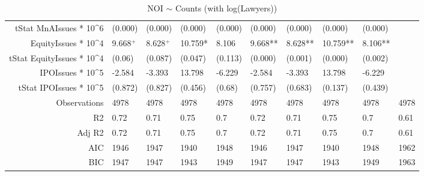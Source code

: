 \begin{table}[ht]
\begin{tabular}{rlllllllll}
  tStat MnAIssues * 10^6 & (0.000) & (0.000) & (0.000) & (0.000) & (0.000) & (0.000) & (0.000) & (0.000) &  \\ 
  EquityIssues * 10^4 & 9.668$^{+}$ & 8.628$^{+}$ & 10.759* & 8.106 & 9.668** & 8.628** & 10.759** & 8.106** &  \\ 
  tStat EquityIssues * 10^4 & (0.06) & (0.087) & (0.047) & (0.113) & (0.000) & (0.001) & (0.000) & (0.002) &  \\ 
  IPOIssues * 10^5 & -2.584 & -3.393 & 13.798 & -6.229 & -2.584 & -3.393 & 13.798 & -6.229 &  \\ 
  tStat IPOIssues * 10^5 & (0.872) & (0.827) & (0.456) & (0.68) & (0.757) & (0.683) & (0.137) & (0.439) &  \\ 
  Observations & 4978 & 4978 & 4978 & 4978 & 4978 & 4978 & 4978 & 4978 & 4978 \\ 
  R2 & 0.72 & 0.71 & 0.75 & 0.7 & 0.72 & 0.71 & 0.75 & 0.7 & 0.61 \\ 
  Adj R2 & 0.72 & 0.71 & 0.75 & 0.7 & 0.72 & 0.71 & 0.75 & 0.7 & 0.61 \\ 
  AIC & 1946 & 1947 & 1940 & 1948 & 1946 & 1947 & 1940 & 1948 & 1962 \\ 
  BIC & 1947 & 1947 & 1943 & 1949 & 1947 & 1947 & 1943 & 1949 & 1963 \\ 
   \hline
\end{tabular}
\caption{NOI $\sim$ Counts (with log(Lawyers))} 
\end{table}
